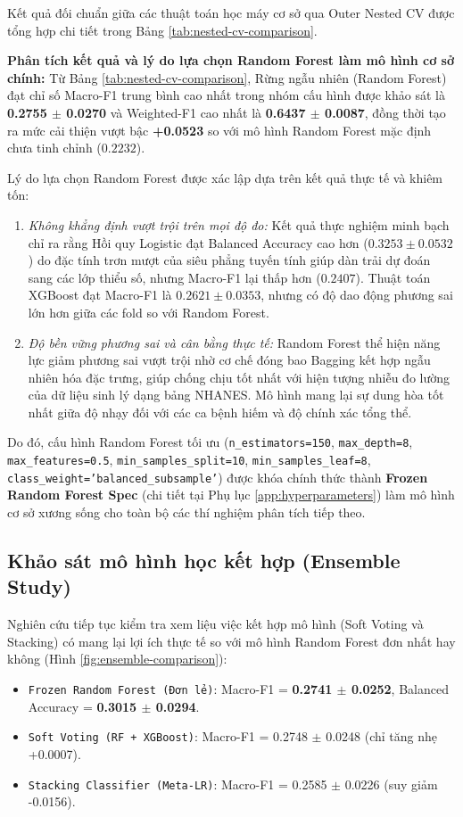 Kết quả đối chuẩn giữa các thuật toán học máy cơ sở qua Outer Nested CV được tổng hợp chi tiết trong Bảng \ref{tab:nested-cv-comparison}.



\textbf{Phân tích kết quả và lý do lựa chọn Random Forest làm mô hình cơ sở chính:}
Từ Bảng \ref{tab:nested-cv-comparison}, Rừng ngẫu nhiên (Random Forest) đạt chỉ số Macro-F1 trung bình cao nhất trong nhóm cấu hình được khảo sát là \textbf{0.2755 $\pm$ 0.0270} và Weighted-F1 cao nhất là \textbf{0.6437 $\pm$ 0.0087}, đồng thời tạo ra mức cải thiện vượt bậc \textbf{+0.0523} so với mô hình Random Forest mặc định chưa tinh chỉnh ($0.2232$). 

Lý do lựa chọn Random Forest được xác lập dựa trên kết quả thực tế và khiêm tốn:
\begin{enumerate}
    \item \textit{Không khẳng định vượt trội trên mọi độ đo:} Kết quả thực nghiệm minh bạch chỉ ra rằng Hồi quy Logistic đạt Balanced Accuracy cao hơn ($0.3253 \pm 0.0532$) do đặc tính trơn mượt của siêu phẳng tuyến tính giúp dàn trải dự đoán sang các lớp thiểu số, nhưng Macro-F1 lại thấp hơn ($0.2407$). Thuật toán XGBoost đạt Macro-F1 là $0.2621 \pm 0.0353$, nhưng có độ dao động phương sai lớn hơn giữa các fold so với Random Forest.
    \item \textit{Độ bền vững phương sai và cân bằng thực tế:} Random Forest thể hiện năng lực giảm phương sai vượt trội nhờ cơ chế đóng bao Bagging kết hợp ngẫu nhiên hóa đặc trưng, giúp chống chịu tốt nhất với hiện tượng nhiễu đo lường của dữ liệu sinh lý dạng bảng NHANES. Mô hình mang lại sự dung hòa tốt nhất giữa độ nhạy đối với các ca bệnh hiếm và độ chính xác tổng thể.
\end{enumerate}

Do đó, cấu hình Random Forest tối ưu (\texttt{n\_estimators=150}, \texttt{max\_depth=8}, \texttt{max\_features=0.5}, \texttt{min\_samples\_split=10}, \texttt{min\_samples\_leaf=8}, \texttt{class\_weight='balanced\_subsample'}) được khóa chính thức thành \textbf{Frozen Random Forest Spec} (chi tiết tại Phụ lục \ref{app:hyperparameters}) làm mô hình cơ sở xương sống cho toàn bộ các thí nghiệm phân tích tiếp theo.

\subsection{Khảo sát mô hình học kết hợp (Ensemble Study)}
Nghiên cứu tiếp tục kiểm tra xem liệu việc kết hợp mô hình (Soft Voting và Stacking) có mang lại lợi ích thực tế so với mô hình Random Forest đơn nhất hay không (Hình \ref{fig:ensemble-comparison}):
\begin{itemize}
    \item \texttt{Frozen Random Forest (Đơn lẻ)}: Macro-F1 = \textbf{0.2741 $\pm$ 0.0252}, Balanced Accuracy = \textbf{0.3015 $\pm$ 0.0294}.
    \item \texttt{Soft Voting (RF + XGBoost)}: Macro-F1 = 0.2748 $\pm$ 0.0248 (chỉ tăng nhẹ +0.0007).
    \item \texttt{Stacking Classifier (Meta-LR)}: Macro-F1 = 0.2585 $\pm$ 0.0226 (suy giảm -0.0156).
\end{itemize}

